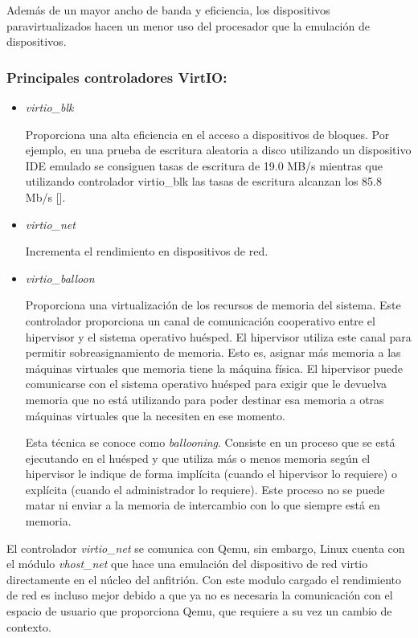 \documentclass[spanisheDIVcalc,twoside,parskip-,pointlessnumbers,final]{scrbook}
\begin{document}
Además de un mayor ancho de banda y eficiencia, los dispositivos paravirtualizados
hacen un menor uso del procesador que la emulación de dispositivos.


\subsubsection*{Principales controladores VirtIO:\label{sub:Principales-controladores-VirtIO}}
\begin{itemize}
\item \emph{virtio\_blk}


Proporciona una alta eficiencia en el acceso a dispositivos de bloques.
Por ejemplo, en una prueba de escritura aleatoria a disco utilizando
un dispositivo IDE emulado se consiguen tasas de escritura de 19.0
MB/s mientras que utilizando controlador virtio\_blk las tasas de
escritura alcanzan los 85.8 Mb/s [\cite{KVMBestPractices}].

\item \emph{virtio\_net}


Incrementa el rendimiento en dispositivos de red. 

\item \emph{virtio\_balloon}


Proporciona una virtualización de los recursos de memoria del sistema.
Este controlador proporciona un canal de comunicación cooperativo
entre el hipervisor y el sistema operativo huésped. El hipervisor
utiliza este canal para permitir sobreasignamiento de memoria. Esto
es, asignar más memoria a las máquinas virtuales que memoria tiene
la máquina física. El hipervisor puede comunicarse con el sistema
operativo huésped para exigir que le devuelva memoria que no está
utilizando para poder destinar esa memoria a otras máquinas virtuales
que la necesiten en ese momento.


Esta técnica se conoce como \emph{ballooning}. Consiste en un proceso
que se está ejecutando en el huésped y que utiliza más o menos memoria
según el hipervisor le indique de forma implícita (cuando el hipervisor
lo requiere) o explícita (cuando el administrador lo requiere). Este
proceso no se puede matar ni enviar a la memoria de intercambio con
lo que siempre está en memoria.

\end{itemize}
El controlador \emph{virtio\_net} se comunica con Qemu, sin embargo,
Linux cuenta con el módulo \emph{vhost\_net }que hace una emulación
del dispositivo de red virtio directamente en el núcleo del anfitrión.
Con este modulo cargado el rendimiento de red es incluso mejor debido
a que ya no es necesaria la comunicación con el espacio de usuario
que proporciona Qemu, que requiere a su vez un cambio de contexto.
\end{document}
